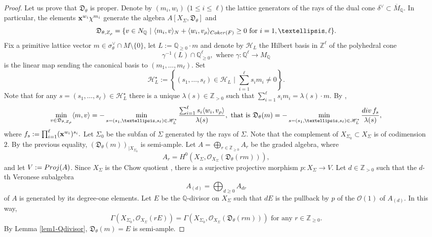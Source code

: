 \documentclass[11pt, reqno]{amsart}
\theoremstyle{plain}
\theoremstyle{definition}
\theoremstyle{remark}
\begin{document}
\begin{proof}
Let us prove that $\mathfrak{D}_{\theta}$ is proper. Denote by $(m_{i}, w_{i})$ ($1\leq i\leq \ell$) the lattice generators of the rays of the dual cone $\delta^{\vee} \subset  \overline{M}_{\mathbb{Q}}$. In particular,
the elements ${\bf x}^{w_{i}}\chi^{m_{i}}$ generate the algebra $A[X_{\Sigma}, \mathfrak{D}_{\theta}]$ and
$$\mathfrak{D}_{\theta, Z_{\rho}} =  \{ v\in N_{\mathbb{Q}}\,\,|\,\, \langle m_{i}, v\rangle_{N} +  \langle w_{i}, v_{\rho}\rangle_{{\rm Coker}(F)}\geq 0 \text{ for } i= 1, \ldots, \ell\} .$$
Fix a primitive lattice vector $m\in\sigma^{\vee}_{\theta}\cap M \setminus \{0\}$, 
let $L:= \mathbb{Q}_{\geq 0}\cdot m$ and denote by $\mathscr{H}_{L}$ the Hilbert basis 
in $\mathbb{Z}^{\ell}$ of the polyhedral cone 
$$\gamma^{-1}(L)\cap \mathbb{Q}_{\geq 0}^{\ell}, \text{ where } \gamma: \mathbb{Q}^{\ell}\rightarrow M_{\mathbb{Q}}$$
is the linear map sending the canonical basis to $(m_{1}, \ldots, m_{\ell})$. Set
$$\mathscr{H}_{L}^{\star}:= \left\{(s_{1}, \ldots, s_{\ell})\in \mathscr{H}_{L}\,\,|\,\, \sum_{i = 1}^{\ell} s_{i} m_{i}\neq 0\right\}.$$
Note that for any $s = (s_{1}, \ldots, s_{\ell})\in \mathscr{H}_{L}^{\star}$ there is a unique $\lambda(s)\in \mathbb{Z}_{>0}$ such that
$\sum_{i = 1}^{\ell} s_{i} m_{i}  =  \lambda(s)\cdot m.$
By \cite[Lemma 2.11]{Lan15},
$$\min_{v\in \mathfrak{D}_{\theta, Z_{\rho}}}\langle m, v\rangle  =  -\min_{s = (s_{1}, \ldots, s_{\ell})\in \mathscr{H}_{L}^{\star}}\frac{\sum_{i = 1}^{\ell} s_{i} \langle w_{i}, v_{\rho}\rangle}{\lambda(s)}, \text{ that is } \mathfrak{D}_{\theta}(m) =  -\min_{s = (s_{1}, \ldots, s_{\ell})\in \mathscr{H}_{L}^{\star}}\frac{{\rm div}\, f_{s}}{\lambda(s)},$$
where 
$ f_{s}:= \prod_{i = 1}^{\ell} ({\bf x}^{w_{i}})^{s_{i}}.$
Let $\Sigma_{0}$ be the subfan of $\Sigma$ generated by the rays of $\Sigma$.  Note that the complement of $X_{\Sigma_{0}} \subset X_{\Sigma}$ is of codimension $2$. By the previous equality, $(\mathfrak{D}_{\theta}(m))_{|X_{\Sigma_{0}}}$
is semi-ample. Let $A  =  \bigoplus_{r\in\mathbb{Z}_{\geq 0}}A_{r}$ be the graded algebra, where  $$A_{r} = H^{0}(X_{\Sigma}, \mathcal{O}_{X_{\Sigma}}(\mathfrak{D}_{\theta}(rm))),$$ and let $V:= {\rm Proj}(A)$. Since $X_{\Sigma}$ is the Chow quotient \cite[Section 4]{KSZ91}, there is a surjective projective morphism $p: X_{\Sigma}\rightarrow V$. Let $d\in\mathbb{Z}_{>0}$
such that the $d$-th Veronese subalgebra 
$$A_{(d)} = \bigoplus_{d\geq 0} A_{dr}$$ of 
$A$ is generated
by its degree-one elements. Let $E$ be the $\mathbb{Q}$-divisor 
on $X_{\Sigma}$ such that $dE$ is the pullback by $p$ of the $\mathcal{O}(1)$ of $A_{(d)}$. In this way, 
$$\Gamma(X_{\Sigma_{0}}, \mathcal{O}_{X_{\Sigma}}(rE)) = \Gamma(X_{\Sigma_{0}}, \mathcal{O}_{X_{\Sigma}}(\mathfrak{D}_{\theta}(rm)))\text{ for any  }r\in\mathbb{Z}_{\geq 0}.$$ By Lemma \ref{lem1-Qdivisor}, $\mathfrak{D}_{\theta}(m) = E$ is semi-ample. 


\end{proof}
\end{document}
